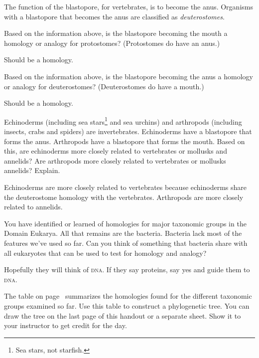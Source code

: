 \documentclass[12pt, hidelinks]{exam}
\newcommand*\AnswerBox[2]{%
    \parbox[t][#1]{0.92\textwidth}{%
    \begin{solution}#2\end{solution}}
    \vspace{\stretch{1}}
}
\begin{document}
\begin{questions}
The function of the blastopore, for vertebrates, is to become the anus.  Organisms with a blastopore that becomes
the anus are classified as \emph{deuterostomes}. 

\newpage

\question
Based on the information above, is the blastopore becoming the mouth a 
homology or analogy for protostomes? (Protostomes do have an anus.)

\AnswerBox{3\baselineskip}{Should be a homology.}

\question
Based on the information above, is the blastopore becoming the anus a 
homology or analogy for deuterostomes? (Deuterostomes do have a mouth.)

\AnswerBox{3\baselineskip}{Should be a homology.}

\question
Echinoderms (including sea stars\footnote{Sea stars, not starfish.} and sea urchins) 
and arthropods (including insects, crabs and spiders) are invertebrates. 
Echinoderms have a blastopore that forms the anus. 
Arthropods have a blastopore that forms the mouth.
Based on this, are echinoderms more closely related to vertebrates
or mollusks and annelids? Are arthropods more closely related to vertebrates or mollusks 
annelids? Explain.

\AnswerBox{4\baselineskip}{Echinoderms are more closely related to vertebrates because
echinoderms share the deuterostome homology with the vertebrates. Arthropods are more closely related to annelids.}

\question
You have identified or learned of homologies for major taxonomic groups in the Domain Eukarya. All that remains are the bacteria. Bacteria lack most of the features we've used so far. Can you think of something that bacteria share with all eukaryotes that can be used to test for homology and analogy?

\AnswerBox{2\baselineskip}{Hopefully they will think of \textsc{dna}. If they say proteins, say yes and guide them to \textsc{dna.}}

\question[Checkout]
The table on page~\pageref{presence_table} summarizes the homologies found for the different taxonomic groups examined so far. Use this table to construct a phylogenetic tree. You can draw the tree on the last page of this handout or a separate sheet. Show it to your instructor to get credit for the day.


\end{questions}
\end{document}

